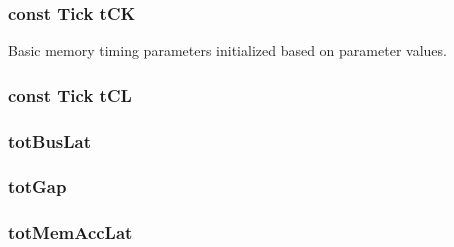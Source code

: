 \label{classDRAMCtrl_a15520c5298cfcc33032b7f0e363f7a3d}
\hypertarget{classDRAMCtrl_a9cd12bc6d433964d98ff2386c03e5246}{
\subsubsection[{tCK}]{\setlength{\rightskip}{0pt plus 5cm}const {\bf Tick} {\bf tCK}}}
\label{classDRAMCtrl_a9cd12bc6d433964d98ff2386c03e5246}
Basic memory timing parameters initialized based on parameter values. \hypertarget{classDRAMCtrl_a96c42cd586bf995db505fbb5c0252ac1}{
\subsubsection[{tCL}]{\setlength{\rightskip}{0pt plus 5cm}const {\bf Tick} {\bf tCL}}}
\label{classDRAMCtrl_a96c42cd586bf995db505fbb5c0252ac1}
\hypertarget{classDRAMCtrl_abbb23dd61d5f4a897a59ea51328ad3fd}{
\subsubsection[{totBusLat}]{ {\bf totBusLat}}}
\label{classDRAMCtrl_abbb23dd61d5f4a897a59ea51328ad3fd}
\hypertarget{classDRAMCtrl_ad5c827068947b103cac8503aa45cf6e5}{
\subsubsection[{totGap}]{ {\bf totGap}}}
\label{classDRAMCtrl_ad5c827068947b103cac8503aa45cf6e5}
\hypertarget{classDRAMCtrl_a9aa73ba3e536064d1686b6489e57a4bf}{
\subsubsection[{totMemAccLat}]{ {\bf totMemAccLat}}}
